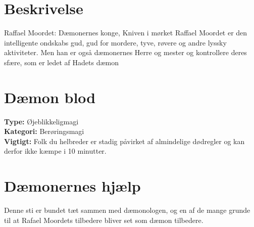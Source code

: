 \section{Beskrivelse}
Raffael Moordet: Dæmonernes konge, Kniven i mørket Raffael Moordet er den intelligente ondskabs
gud, gud for mordere, tyve, røvere og andre lyssky aktiviteter. Men han er også dæmonernes Herre og
mester og kontrollere deres sfære, som er ledet af Hadets dæmon

\section{Dæmon blod}
\textbf{Type:} Øjeblikkeligmagi\\
\textbf{Kategori:} Berøringsmagi\\
\textbf{Vigtigt:} Folk du helbreder er stadig påvirket af almindelige dødregler og kan derfor ikke kæmpe i 10 minutter.\\

\section{Dæmonernes hjælp}
Denne sti er bundet tæt sammen med dæmonologen, og en af de mange grunde til at Rafael Moordets tilbedere bliver set som dæmon tilbedere.\\
